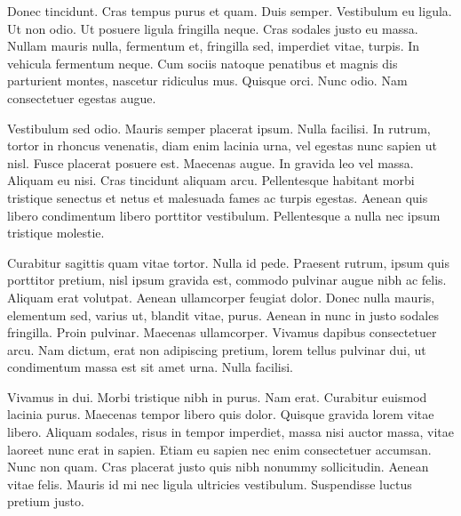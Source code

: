 Donec tincidunt. Cras tempus purus et quam. Duis semper. Vestibulum eu ligula. Ut non odio. Ut posuere ligula fringilla neque. Cras sodales justo eu massa. Nullam mauris nulla, fermentum et, fringilla sed, imperdiet vitae, turpis. In vehicula fermentum neque. Cum sociis natoque penatibus et magnis dis parturient montes, nascetur ridiculus mus. Quisque orci. Nunc odio. Nam consectetuer egestas augue.

Vestibulum sed odio. Mauris semper placerat ipsum. Nulla facilisi. In rutrum, tortor in rhoncus venenatis, diam enim lacinia urna, vel egestas nunc sapien ut nisl. Fusce placerat posuere est. Maecenas augue. In gravida leo vel massa. Aliquam eu nisi. Cras tincidunt aliquam arcu. Pellentesque habitant morbi tristique senectus et netus et malesuada fames ac turpis egestas. Aenean quis libero condimentum libero porttitor vestibulum. Pellentesque a nulla nec ipsum tristique molestie.

Curabitur sagittis quam vitae tortor. Nulla id pede. Praesent rutrum, ipsum quis porttitor pretium, nisl ipsum gravida est, commodo pulvinar augue nibh ac felis. Aliquam erat volutpat. Aenean ullamcorper feugiat dolor. Donec nulla mauris, elementum sed, varius ut, blandit vitae, purus. Aenean in nunc in justo sodales fringilla. Proin pulvinar. Maecenas ullamcorper. Vivamus dapibus consectetuer arcu. Nam dictum, erat non adipiscing pretium, lorem tellus pulvinar dui, ut condimentum massa est sit amet urna. Nulla facilisi.

Vivamus in dui. Morbi tristique nibh in purus. Nam erat. Curabitur euismod lacinia purus. Maecenas tempor libero quis dolor. Quisque gravida lorem vitae libero. Aliquam sodales, risus in tempor imperdiet, massa nisi auctor massa, vitae laoreet nunc erat in sapien. Etiam eu sapien nec enim consectetuer accumsan. Nunc non quam. Cras placerat justo quis nibh nonummy sollicitudin. Aenean vitae felis. Mauris id mi nec ligula ultricies vestibulum. Suspendisse luctus pretium justo. 
